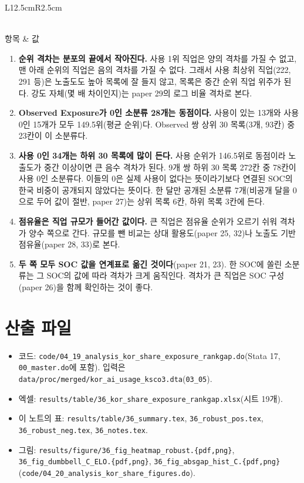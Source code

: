 \documentclass[11pt]{article}
\begin{document}
\begin{longtable}{L{12.5cm}R{2.5cm}}
\caption{점검 수치}\label{tab:notes}\\
\toprule
항목 & 값 \\
\midrule
\endfirsthead

\bottomrule
\end{longtable}

\begin{enumerate}[leftmargin=*]
  \item \textbf{순위 격차는 분포의 끝에서 작아진다.} 사용 1위 직업은 양의 격차를 가질 수 없고, 맨 아래 순위의 직업은 음의 격차를 가질 수 없다. 그래서 사용 최상위 직업(222, 291 등)은 노출도도 높아 목록에 잘 들지 않고, 목록은 중간 순위 직업 위주가 된다. 강도 자체(몇 배 차이인지)는 paper 29의 로그 비율 격차로 본다.
  \item \textbf{Observed Exposure가 0인 소분류 28개는 동점이다.} 사용이 있는 13개와 사용 0인 15개가 모두 149.5위(평균 순위)다. Observed 쌍 상위 30 목록(3개, 93칸) 중 23칸이 이 소분류다.
  \item \textbf{사용 0인 34개는 하위 30 목록에 많이 든다.} 사용 순위가 146.5위로 동점이라 노출도가 중간 이상이면 큰 음수 격차가 된다. 9개 쌍 하위 30 목록 272칸 중 78칸이 사용 0인 소분류다. 이들의 0은 실제 사용이 없다는 뜻이라기보다 연결된 SOC의 한국 비중이 공개되지 않았다는 뜻이다. 한 달만 공개된 소분류 7개(비공개 달을 0으로 두어 값이 절반, paper 27)는 상위 목록 6칸, 하위 목록 3칸에 든다.
  \item \textbf{점유율은 직업 규모가 들어간 값이다.} 큰 직업은 점유율 순위가 오르기 쉬워 격차가 양수 쪽으로 간다. 규모를 뺀 비교는 상대 활용도(paper 25, 32)나 노출도 기반 점유율(paper 28, 33)로 본다.
  \item \textbf{두 쪽 모두 SOC 값을 연계표로 옮긴 것이다}(paper 21, 23). 한 SOC에 쏠린 소분류는 그 SOC의 값에 따라 격차가 크게 움직인다. 격차가 큰 직업은 SOC 구성(paper 26)을 함께 확인하는 것이 좋다.
\end{enumerate}

\section{산출 파일}

\begin{itemize}[leftmargin=*]
  \item 코드: \texttt{code/04\_19\_analysis\_kor\_share\_exposure\_rankgap.do}(Stata 17, \texttt{00\_master.do}에 포함). 입력은 \texttt{data/proc/merged/kor\_ai\_usage\_ksco3.dta}(\texttt{03\_05}).
  \item 엑셀: \texttt{results/table/36\_kor\_share\_exposure\_rankgap.xlsx}(시트 19개).
  \item 이 노트의 표: \texttt{results/table/36\_summary.tex}, \texttt{36\_robust\_pos.tex}, \texttt{36\_robust\_neg.tex}, \texttt{36\_notes.tex}.
  \item 그림: \texttt{results/figure/36\_fig\_heatmap\_robust.\{pdf,png\}}, \texttt{36\_fig\_dumbbell\_C\_ELO.\{pdf,png\}}, \texttt{36\_fig\_absgap\_hist\_C.\{pdf,png\}}(\texttt{code/04\_20\_analysis\_kor\_share\_figures.do}).
\end{itemize}

\printbibliography[title={참고문헌}]
\end{document}

